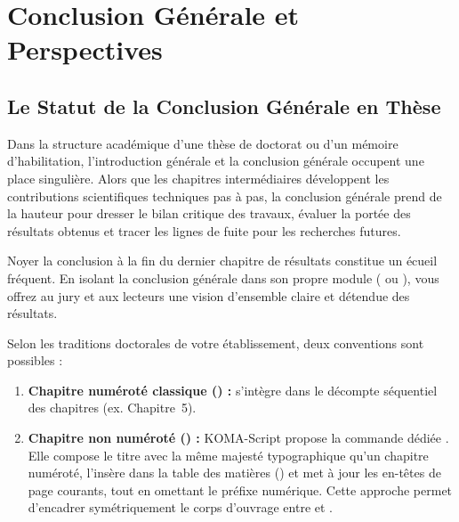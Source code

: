 \chapter{Conclusion Générale et Perspectives}
\label{chap:conclusion-generale}

\section{Le Statut de la Conclusion Générale en Thèse}
\label{sec:conclusion-statut}

Dans la structure académique d'une thèse de doctorat ou d'un mémoire d'habilitation,
l'introduction générale et la conclusion générale occupent une place singulière.
Alors que les chapitres intermédiaires développent les contributions scientifiques techniques pas à pas,
la conclusion générale prend de la hauteur pour dresser le bilan critique des travaux,
évaluer la portée des résultats obtenus et tracer les lignes de fuite pour les recherches futures.

Noyer la conclusion à la fin du dernier chapitre de résultats constitue un écueil fréquent.
En isolant la conclusion générale dans son propre module ( ou ),
vous offrez au jury et aux lecteurs une vision d'ensemble claire et détendue des résultats.

\begin{callout}
Selon les traditions doctorales de votre établissement, deux conventions sont possibles :
\begin{enumerate}
  \item \textbf{Chapitre numéroté classique () :}
  s'intègre dans le décompte séquentiel des chapitres (ex. Chapitre~5).
  \item \textbf{Chapitre non numéroté () :}
  KOMA-Script propose la commande dédiée .
  Elle compose le titre avec la même majesté typographique qu'un chapitre numéroté,
  l'insère dans la table des matières ()
  et met à jour les en-têtes de page courants, tout en omettant le préfixe numérique.
  Cette approche permet d'encadrer symétriquement le corps d'ouvrage
  entre  et .
\end{enumerate}
\end{callout}

